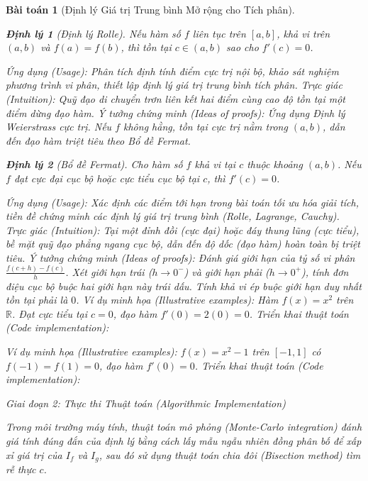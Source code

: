 \documentclass{article}
\newtheorem{baitoan}{Bài toán}
\newtheorem{dinhly}{Định lý}
\begin{document}
\begin{baitoan}[Định lý Giá trị Trung bình Mở rộng cho Tích phân]
\begin{dinhly}[Định lý Rolle]
Nếu hàm số $f$ liên tục trên $[a, b]$, khả vi trên $(a, b)$ và $f(a) = f(b)$, thì tồn tại $c \in (a, b)$ sao cho $f'(c) = 0$.
\end{dinhly}
\emph{Ứng dụng (Usage):} Phân tích định tính điểm cực trị nội bộ, khảo sát nghiệm phương trình vi phân, thiết lập định lý giá trị trung bình tích phân.
\emph{Trực giác (Intuition):} Quỹ đạo di chuyển trơn liên kết hai điểm cùng cao độ tồn tại một điểm dừng đạo hàm.
\emph{Ý tưởng chứng minh (Ideas of proofs):} Ứng dụng Định lý Weierstrass cực trị. Nếu $f$ không hằng, tồn tại cực trị nằm trong $(a, b)$, dẫn đến đạo hàm triệt tiêu theo Bổ đề Fermat.

\begin{dinhly}[Bổ đề Fermat]
Cho hàm số $f$ khả vi tại $c$ thuộc khoảng $(a, b)$. Nếu $f$ đạt cực đại cục bộ hoặc cực tiểu cục bộ tại $c$, thì $f'(c) = 0$.
\end{dinhly}
\emph{Ứng dụng (Usage):} Xác định các điểm tới hạn trong bài toán tối ưu hóa giải tích, tiền đề chứng minh các định lý giá trị trung bình (Rolle, Lagrange, Cauchy).
\emph{Trực giác (Intuition):} Tại một đỉnh đồi (cực đại) hoặc đáy thung lũng (cực tiểu), bề mặt quỹ đạo phẳng ngang cục bộ, dẫn đến độ dốc (đạo hàm) hoàn toàn bị triệt tiêu.
\emph{Ý tưởng chứng minh (Ideas of proofs):} Đánh giá giới hạn của tỷ số vi phân $\frac{f(c+h) - f(c)}{h}$. Xét giới hạn trái ($h \to 0^-$) và giới hạn phải ($h \to 0^+$), tính đơn điệu cục bộ buộc hai giới hạn này trái dấu. Tính khả vi ép buộc giới hạn duy nhất tồn tại phải là $0$.
\emph{Ví dụ minh họa (Illustrative examples):} Hàm $f(x) = x^2$ trên $\mathbb{R}$. Đạt cực tiểu tại $c = 0$, đạo hàm $f'(0) = 2(0) = 0$.
\emph{Triển khai thuật toán (Code implementation):}


\emph{Ví dụ minh họa (Illustrative examples):} $f(x) = x^2 - 1$ trên $[-1, 1]$ có $f(-1) = f(1) = 0$, đạo hàm $f'(0) = 0$.
\emph{Triển khai thuật toán (Code implementation):}



\vspace{0.5em}\noindent\emph{Giai đoạn 2: Thực thi Thuật toán (Algorithmic Implementation)}
 
 Trong môi trường máy tính, thuật toán mô phỏng (Monte-Carlo integration) đánh giá tính đúng đắn của định lý bằng cách lấy mẫu ngẫu nhiên đồng phân bố để xấp xỉ giá trị của $I_f$ và $I_g$, sau đó sử dụng thuật toán chia đôi (Bisection method) tìm rễ thực $c$.


\end{baitoan}
\end{document}
